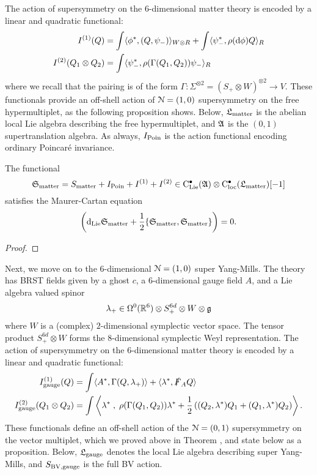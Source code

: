 \documentclass[10pt, oneside]{article}
\begin{document}
The action of supersymmetry on the $6$-dimensional matter theory is encoded by a linear and quadratic functional:
\begin{align*}
I^{(1)} (Q) & = \int \langle\phi^*, (Q, \psi_-)\rangle_{W \otimes R} + \int \langle\psi^*_-, \rho({\rm d} \phi) Q\rangle_R \\
I^{(2)} (Q_1 \otimes Q_2) & = \int \langle\psi^*_- , \rho(\Gamma(Q_1, Q_2)) \psi_-\rangle_R 
\end{align*}
where we recall that the pairing is of the form $\Gamma : \Sigma^{\otimes 2} = (S_+ \otimes W)^{\otimes 2} \to V$. 
These functionals provide an off-shell action of $\mathcal N = (1,0)$ supersymmetry on the free hypermultiplet, as the following proposition shows.
Below, $\mathfrak L_{\rm matter}$ is the abelian local Lie algebra describing the free hypermultiplet, and $\mathfrak{A}$ is the $(0,1)$ supertranslation algebra.  
As always, $I_{\rm Poin}$ is the action functional encoding ordinary Poincar\'{e} invariance. 

\begin{prop}
The functional
\[
\mathfrak S_{\rm matter} = S_{\rm matter} + I_{\rm Poin} + I^{(1)} + I^{(2)} \in {\rm C}_{\rm Lie}^\bullet(\mathfrak{A}) \otimes {\rm C}_{\rm loc}^\bullet(\mathfrak L_{\rm matter}) [-1]
\]
satisfies the Maurer-Cartan equation
\[
\left({\rm d}_{\rm Lie} \mathfrak S_{\rm matter} + \frac{1}{2} \{\mathfrak S_{\rm matter}, \mathfrak S_{\rm matter}\} \right) = 0 .
\]
\end{prop}
\begin{proof}
\end{proof}

Next, we move on to the $6$-dimensional $\mathcal N=(1,0)$ super Yang-Mills. 
The theory has BRST fields given by a ghost $c$, a $6$-dimensional gauge field $A$, and a Lie algebra valued spinor
\[
\lambda_+ \in \Omega^0(\mathbb R^6) \otimes S_+^{6d} \otimes W \otimes \mathfrak g 
\]
where $W$ is a (complex) $2$-dimensional symplectic vector space. 
The tensor product $S_+^{6d} \otimes W$ forms the $8$-dimensional symplectic Weyl representation. 
The action of supersymmetry on the $6$-dimensional matter theory is encoded by a linear and quadratic functional:
\begin{align*}
I_{\rm gauge}^{(1)}(Q) & = \int \langle A^*, \Gamma(Q, \lambda_+)\rangle + \langle\lambda^*, \slashed{F}_A Q\rangle \\
I_{\rm gauge}^{(2)}(Q_1 \otimes Q_2) & = \int \left\langle\lambda^* \;,\; \rho(\Gamma(Q_1,Q_2)) \lambda^* + \frac 12 \left((Q_2, \lambda^*)Q_1 + (Q_1, \lambda^*)Q_2\right)\right\rangle  .
\end{align*}
These functionals define an off-shell action of the $\mathcal N = (0,1)$ supersymmetry on the vector multiplet, which we proved above in Theorem \label{SUSY_YM_theorem}, and state below as a proposition. 
Below, $\mathfrak L_{\rm gauge}$ denotes the local Lie algebra describing super Yang-Mills, and $S_{\rm BV, gauge}$ is the full BV action. 
\end{document}
